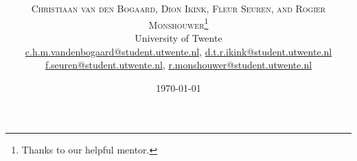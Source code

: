 \documentclass[twoside]{article}
\title{\vspace{-15mm}\fontsize{24pt}{10pt}\selectfont\textbf{\articletitle}} %
\author{
\large
\textsc{Christiaan van den Bogaard, Dion Ikink, Fleur Seuren, and Rogier Monshouwer}\thanks{Thanks to our helpful mentor.}\\[2mm] %
\normalsize University of Twente \\ %
\normalsize \href{mailto:c.h.m.vandenbogaard@student.utwente.nl}{c.h.m.vandenbogaard@student.utwente.nl}, 
\href{mailto:d.t.r.ikink@student.utwente.nl}{d.t.r.ikink@student.utwente.nl} \\
\normalsize\href{mailto:f.seuren@student.utwente.nl}{f.seuren@student.utwente.nl}, %
\href{mailto:r.monshouwer@student.utwente.nl}{r.monshouwer@student.utwente.nl}
}
\date{\today}
\begin{document}
\thispagestyle{empty}
\maketitle %


\begin{abstract}

\noindent \lipsum[1] %

\end{abstract}

\end{document}
